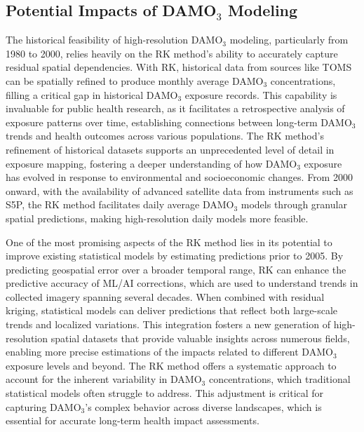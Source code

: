 \subsection{Potential Impacts of DAMO$_3$ Modeling} \label{discussion:histtrends} The historical feasibility of high-resolution DAMO$_3$ modeling, particularly from 1980 to 2000, relies heavily on the RK method’s ability to accurately capture residual spatial dependencies. With RK, historical data from sources like TOMS can be spatially refined to produce monthly average DAMO$_3$ concentrations, filling a critical gap in historical DAMO$_3$ exposure records. This capability is invaluable for public health research, as it facilitates a retrospective analysis of exposure patterns over time, establishing connections between long-term DAMO$_3$ trends and health outcomes across various populations. The RK method’s refinement of historical datasets supports an unprecedented level of detail in exposure mapping, fostering a deeper understanding of how DAMO$_3$ exposure has evolved in response to environmental and socioeconomic changes. From 2000 onward, with the availability of advanced satellite data from instruments such as S5P, the RK method facilitates daily average DAMO$_3$ models through granular spatial predictions, making high-resolution daily models more feasible.

One of the most promising aspects of the RK method lies in its potential to improve existing statistical models by estimating predictions prior to 2005. By predicting geospatial error over a broader temporal range, RK can enhance the predictive accuracy of ML/AI corrections, which are used to understand trends in collected imagery spanning several decades. When combined with residual kriging, statistical models can deliver predictions that reflect both large-scale trends and localized variations. This integration fosters a new generation of high-resolution spatial datasets that provide valuable insights across numerous fields, enabling more precise estimations of the impacts related to different DAMO$_3$ exposure levels and beyond. The RK method offers a systematic approach to account for the inherent variability in DAMO$_3$ concentrations, which traditional statistical models often struggle to address. This adjustment is critical for capturing DAMO$_3$’s complex behavior across diverse landscapes, which is essential for accurate long-term health impact assessments.